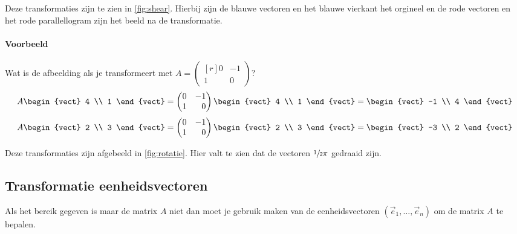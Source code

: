 Deze transformaties zijn te zien in \autoref{fig:shear}. Hierbij zijn de blauwe vectoren en het blauwe vierkant het orgineel en de rode vectoren en het rode parallellogram zijn het beeld na de transformatie.



\paragraph{Voorbeeld} Wat is de afbeelding als je transformeert met $A = \begin{pmatrix*}[r]
	0 & -1 \\
	1 & 0
\end{pmatrix*}$?
\[ A \begin{vect} 4 \\ 1 \end{vect} = \begin{pmatrix*}[r]
	0 & -1 \\
	1 & 0
\end{pmatrix*} \begin{vect} 4 \\ 1 \end{vect} = \begin{vect} -1 \\ 4 \end{vect} \]
\[ A \begin{vect} 2 \\ 3 \end{vect} = \begin{pmatrix*}[r]
	0 & -1 \\
	1 & 0
\end{pmatrix*} \begin{vect} 2 \\ 3 \end{vect} = \begin{vect} -3 \\ 2 \end{vect} \]

Deze transformaties zijn afgebeeld in \autoref{fig:rotatie}. Hier valt te zien dat de vectoren $\sfrac{1}{2}\pi$ gedraaid zijn.



\subsection{Transformatie eenheidsvectoren}
Als het bereik gegeven is maar de matrix $A$ niet dan moet je gebruik maken van de eenheidsvectoren $(\vec{e}_1, \ldots, \vec{e}_n)$ om de matrix $A$ te bepalen.

